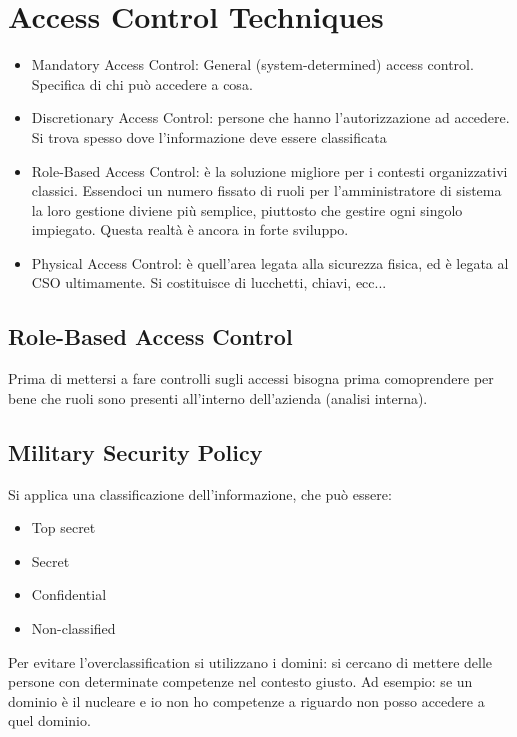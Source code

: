 \chapter{Access Control Techniques}
\label{AccessControlTechniques}
\begin{itemize}
 \item Mandatory Access Control: General (system-determined) access control.
 Specifica di chi può accedere a cosa.
 \item Discretionary Access Control: persone che hanno l'autorizzazione ad
 accedere. Si trova spesso dove l'informazione deve essere classificata
 \item Role-Based Access Control: è la soluzione migliore per i contesti
 organizzativi classici. Essendoci un numero fissato di ruoli per
 l'amministratore di sistema la loro gestione diviene più semplice, piuttosto
che gestire ogni singolo impiegato. Questa realtà è ancora in forte sviluppo.
 \item Physical Access Control: è quell'area legata alla sicurezza fisica, ed è
 legata al CSO ultimamente. Si costituisce di lucchetti, chiavi, ecc...
\end{itemize}


\section{Role-Based Access Control}

Prima di mettersi a fare controlli sugli accessi bisogna prima comoprendere per
bene che ruoli sono presenti all'interno dell'azienda (analisi interna).


\section{Military Security Policy}

Si applica una classificazione dell'informazione, che può essere:
\begin{itemize}
 \item Top secret
 \item Secret
 \item Confidential
 \item Non-classified

\end{itemize}

Per evitare l'overclassification si utilizzano i domini: si cercano di mettere
delle persone con determinate competenze nel contesto giusto.
Ad esempio: se un dominio è il nucleare e io non ho competenze a riguardo non
posso accedere a quel dominio.

